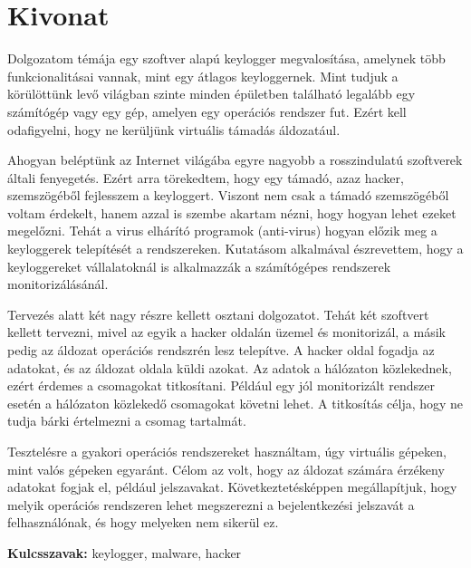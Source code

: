 
\hungarianParagraph


\chapter*{Kivonat}
Dolgozatom témája egy szoftver alapú keylogger megvalosítása, amelynek több funkcionalitásai vannak, mint egy átlagos keyloggernek. Mint tudjuk a körülöttünk levő világban szinte minden épületben található legalább egy számítógép vagy egy gép, amelyen egy operációs rendszer fut. Ezért kell odafigyelni, hogy ne kerüljünk virtuális támadás áldozatául.

Ahogyan beléptünk az Internet világába egyre nagyobb a rosszindulatú szoftverek általi fenyegetés. Ezért arra törekedtem, hogy egy támadó, azaz hacker, szemszögéből fejlesszem a keyloggert. Viszont nem csak a támadó szemszögéből voltam érdekelt, hanem azzal is szembe akartam nézni, hogy hogyan lehet ezeket megelőzni. Tehát a virus elhárító programok (anti-virus) hogyan előzik meg a keyloggerek telepítését a rendszereken. Kutatásom alkalmával észrevettem, hogy a keyloggereket vállalatoknál is alkalmazzák a számítógépes rendszerek monitorizálásánál.

Tervezés alatt két nagy részre kellett osztani dolgozatot. Tehát két szoftvert kellett tervezni, mivel az egyik a hacker oldalán üzemel és monitorizál, a másik pedig az áldozat operációs rendszrén lesz telepítve. A hacker oldal fogadja az adatokat, és az áldozat oldala küldi azokat. Az adatok a hálózaton közlekednek, ezért érdemes a csomagokat titkosítani. Például egy jól monitorizált rendszer esetén a hálózaton közlekedő csomagokat követni lehet. A titkosítás célja, hogy ne tudja bárki értelmezni a csomag tartalmát.

Tesztelésre a gyakori operációs rendszereket használtam, úgy virtuális gépeken, mint valós gépeken egyaránt. Célom az volt, hogy az áldozat számára érzékeny adatokat fogjak el, például jelszavakat. Következtetésképpen megállapítjuk, hogy melyik operációs rendszeren lehet megszerezni a bejelentkezési jelszavát a felhasználónak, és hogy melyeken nem sikerül ez.

\vspace*{2cm}

\noindent \textbf{Kulcsszavak:}  keylogger, malware, hacker
\vfill
{}

